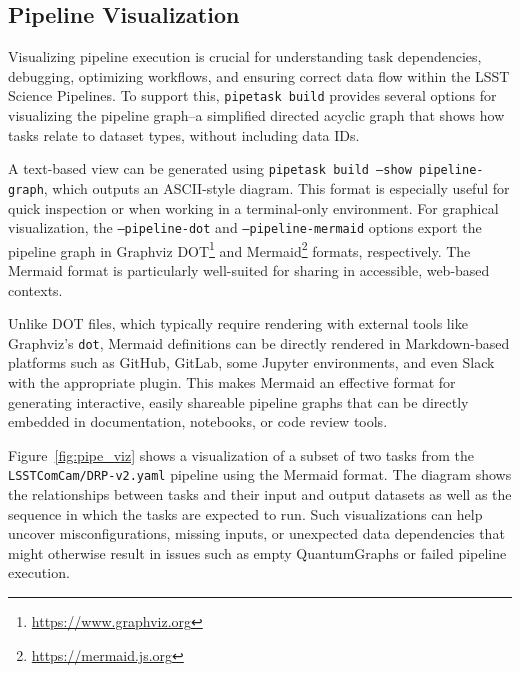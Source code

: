 \subsection{Pipeline Visualization}
\label{sec:pipeline_visualization}

Visualizing pipeline execution is crucial for understanding task dependencies, debugging, optimizing workflows, and ensuring correct data flow within the LSST Science Pipelines.
To support this, \texttt{pipetask build} provides several options for visualizing the pipeline graph--a simplified directed acyclic graph that shows how tasks relate to dataset types, without including data IDs.

A text-based view can be generated using \texttt{pipetask build --show pipeline-graph}, which outputs an ASCII-style diagram.
This format is especially useful for quick inspection or when working in a terminal-only environment.
For graphical visualization, the \texttt{--pipeline-dot} and \texttt{--pipeline-mermaid} options export the pipeline graph in Graphviz DOT\footnote{\url{https://www.graphviz.org}} and Mermaid\footnote{\url{https://mermaid.js.org}} formats, respectively.
The Mermaid format is particularly well-suited for sharing in accessible, web-based contexts.

Unlike DOT files, which typically require rendering with external tools like Graphviz's \texttt{dot}, Mermaid definitions can be directly rendered in Markdown-based platforms such as GitHub, GitLab, some Jupyter environments, and even Slack with the appropriate plugin.
This makes Mermaid an effective format for generating interactive, easily shareable pipeline graphs that can be directly embedded in documentation, notebooks, or code review tools.

Figure~\ref{fig:pipe_viz} shows a visualization of a subset of two tasks from the \texttt{LSSTComCam/DRP-v2.yaml} pipeline using the Mermaid format.
The diagram shows the relationships between tasks and their input and output datasets as well as the sequence in which the tasks are expected to run.
Such visualizations can help uncover misconfigurations, missing inputs, or unexpected data dependencies that might otherwise result in issues such as empty QuantumGraphs or failed pipeline execution.

\begin{figure*}
    \centering
    \caption{
        Example pipeline visualization of four selected tasks from the \texttt{LSSTComCam/DRP-v2.yaml} pipeline in the Mermaid format.
        The diagram illustrates the flow of datasets between tasks, with dashed lines indicating prerequisite inputs.
        This visualization helps validate task dependencies and the expected sequence of execution.
    }
    \label{fig:pipe_viz}
\end{figure*}
